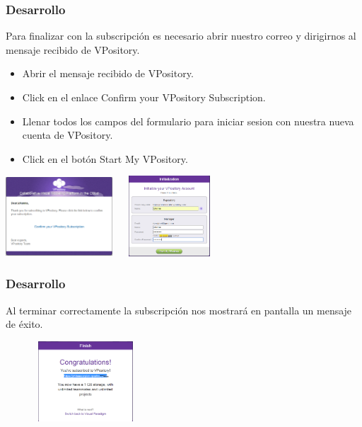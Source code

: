 \documentclass[8pt]{beamer}
\begin{document}
\begin{frame}
\frametitle{Desarrollo}
\setlength{\parskip}{05pt}
Para finalizar con la subscripción es necesario abrir nuestro correo y dirigirnos al mensaje recibido de VPository.
\begin{itemize}
\item{Abrir el mensaje recibido de VPository.}
\item{Click en el enlace Confirm your VPository Subscription.}
\item{Llenar todos los campos del formulario para iniciar sesion con nuestra nueva cuenta de VPository.}
\item{Click en el botón Start My VPository.}
\end{itemize} 
\begin{center}
\setlength{\parskip}{08pt}
\includegraphics[width=4cm, height=3cm]{img/cap5}\hspace{0.5cm}
\includegraphics[width=4cm, height=3cm]{img/cap6}
\end{center}
\end{frame}


\begin{frame}
\frametitle{Desarrollo}
\setlength{\parskip}{05pt}
Al terminar correctamente la subscripción nos mostrará en pantalla un mensaje de éxito.
\begin{center}

\setlength{\parskip}{08pt}
\includegraphics[width=6cm, height=3cm]{img/cap7}\\
\end{center}
\end{frame}
\end{document}
